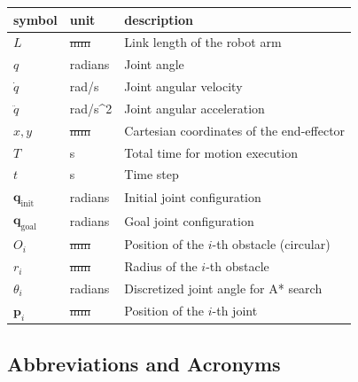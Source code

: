 \documentclass[12pt]{article}
\makeatletter
\providecommand{\DIFaddtex}[1]{{\protect\color{blue}\uwave{#1}}} %
\providecommand{\DIFdeltex}[1]{{\protect\color{red}\sout{#1}}} %
\providecommand{\DIFaddbegin}{} %
\providecommand{\DIFaddend}{} %
\providecommand{\DIFdelbegin}{} %
\providecommand{\DIFdelend}{} %
\providecommand{\DIFadd}[1]{\texorpdfstring{\DIFaddtex{#1}}{#1}} %
\providecommand{\DIFdel}[1]{\texorpdfstring{\DIFdeltex{#1}}{}} %
\newcommand{\DIFscaledelfig}{0.5}
\newlength{\DIFdelgraphicswidth} %
\newlength{\DIFdelgraphicsheight} %
\newcommand{\DIFaddincludegraphics}[2][]{{\color{blue}\fbox{\DIFOincludegraphics[#1]{#2}}}} %
\newcommand{\DIFdelincludegraphics}[2][]{%
\sbox{\DIFdelgraphicsbox}{\DIFOincludegraphics[#1]{#2}}%
\settoboxwidth{\DIFdelgraphicswidth}{\DIFdelgraphicsbox} %
\settoboxtotalheight{\DIFdelgraphicsheight}{\DIFdelgraphicsbox} %
\scalebox{\DIFscaledelfig}{%
\parbox[b]{\DIFdelgraphicswidth}{\usebox{\DIFdelgraphicsbox}\\[-\baselineskip] \rule{\DIFdelgraphicswidth}{0em}}\llap{\resizebox{\DIFdelgraphicswidth}{\DIFdelgraphicsheight}{%
\setlength{\unitlength}{\DIFdelgraphicswidth}%
\begin{picture}(1,1)%
\thicklines\linethickness{2pt} %
{\color[rgb]{1,0,0}\put(0,0){\framebox(1,1){}}}%
{\color[rgb]{1,0,0}\put(0,0){\line( 1,1){1}}}%
{\color[rgb]{1,0,0}\put(0,1){\line(1,-1){1}}}%
\end{picture}%
}\hspace*{3pt}}} %
} %
\DeclareRobustCommand{\DIFaddbegin}{\DIFOaddbegin \let\includegraphics\DIFaddincludegraphics} %
\DeclareRobustCommand{\DIFaddend}{\DIFOaddend \let\includegraphics\DIFOincludegraphics} %
\DeclareRobustCommand{\DIFdelbegin}{\DIFOdelbegin \let\includegraphics\DIFdelincludegraphics} %
\DeclareRobustCommand{\DIFdelend}{\DIFOaddend \let\includegraphics\DIFOincludegraphics} %
\let\sout@orig\sout %
\renewcommand{\sout}[1]{\ifmmode\text{\sout@orig{\ensuremath{#1}}}\else\sout@orig{#1}\fi} %
\makeatother
\begin{document}
\renewcommand{\arraystretch}{1.2}
\noindent \begin{longtable*}{l l p{12cm}} \toprule
\textbf{symbol} & \textbf{unit} & \textbf{description}\\
\midrule 
\( L \) & \DIFdelbegin \DIFdel{\si{\milli\metre} }\DIFdelend \DIFaddbegin \DIFadd{\si{\metre} }\DIFaddend & Link length of the robot arm \\
\( q \) & radians & Joint angle \\
\( \dot{q} \) & rad/s & Joint angular velocity \\
\( \ddot{q} \) & rad/s^2 & Joint angular acceleration \\
\( x, y \) & \DIFdelbegin \DIFdel{\si{\milli\metre} }\DIFdelend \DIFaddbegin \DIFadd{\si{\metre} }\DIFaddend & Cartesian coordinates of the end-effector \\
\( T \) & \si{\second} & Total time for motion execution \\
\( t \) & \si{\second} & Time step \\
\( \mathbf{q}_{\text{init}} \) & radians & Initial joint configuration \\
\( \mathbf{q}_{\text{goal}} \) & radians & Goal joint configuration \\
\( O_i \) & \DIFdelbegin \DIFdel{\si{\milli\metre} }\DIFdelend \DIFaddbegin \DIFadd{\si{\metre} }\DIFaddend & Position of the \(i\)-th obstacle (circular) \\
\( r_i \) & \DIFdelbegin \DIFdel{\si{\milli\metre} }\DIFdelend \DIFaddbegin \DIFadd{\si{\metre} }\DIFaddend & Radius of the \(i\)-th obstacle \\
\( \theta_i \) & radians & Discretized joint angle for A* search \\
\( \mathbf{p}_i \) & \DIFdelbegin \DIFdel{\si{\milli\metre} }\DIFdelend \DIFaddbegin \DIFadd{\si{\metre} }\DIFaddend & Position of the \(i\)-th joint \\

\bottomrule
\end{longtable*}


\subsection{Abbreviations and Acronyms}
\end{document}
